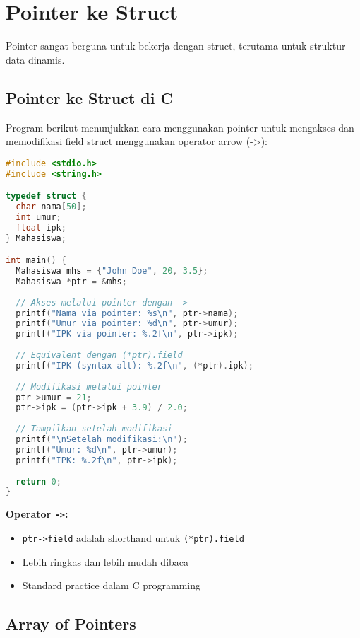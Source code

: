 \documentclass[../main.tex]{subfiles}
\begin{document}
\section{Pointer ke Struct}

Pointer sangat berguna untuk bekerja dengan struct, terutama untuk struktur data dinamis.

\subsection{Pointer ke Struct di C}

Program berikut menunjukkan cara menggunakan pointer untuk mengakses dan memodifikasi field struct menggunakan operator arrow (->):

\begin{lstlisting}[language=C, caption={Pointer to struct di C}]
#include <stdio.h>
#include <string.h>

typedef struct {
  char nama[50];
  int umur;
  float ipk;
} Mahasiswa;

int main() {
  Mahasiswa mhs = {"John Doe", 20, 3.5};
  Mahasiswa *ptr = &mhs;
  
  // Akses melalui pointer dengan ->
  printf("Nama via pointer: %s\n", ptr->nama);
  printf("Umur via pointer: %d\n", ptr->umur);
  printf("IPK via pointer: %.2f\n", ptr->ipk);
  
  // Equivalent dengan (*ptr).field
  printf("IPK (syntax alt): %.2f\n", (*ptr).ipk);
  
  // Modifikasi melalui pointer
  ptr->umur = 21;
  ptr->ipk = (ptr->ipk + 3.9) / 2.0;
  
  // Tampilkan setelah modifikasi
  printf("\nSetelah modifikasi:\n");
  printf("Umur: %d\n", ptr->umur);
  printf("IPK: %.2f\n", ptr->ipk);
  
  return 0;
}
\end{lstlisting}

\textbf{Operator \texttt{->}:}
\begin{itemize}
  \item \texttt{ptr->field} adalah shorthand untuk \texttt{(*ptr).field}
  \item Lebih ringkas dan lebih mudah dibaca
  \item Standard practice dalam C programming
\end{itemize}

\subsection{Array of Pointers}
\end{document}
